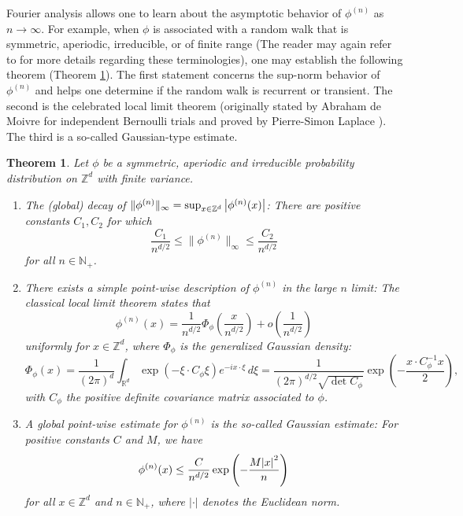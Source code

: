 \documentclass[11pt, letter]{book}
\newtheorem{theorem}{Theorem}[section]
\renewcommand\det{\operatorname{det}}
\newcommand{\lp}{\left(}
\newcommand{\rp}{\right)}
\newcommand{\f}[2]{\frac{#1}{#2}}
\begin{document}
\noindent Fourier analysis allows one to learn about the asymptotic behavior of $\phi^{(n)}$ as $n\to\infty$. For example, when $\phi$ is associated with a random walk that is symmetric, aperiodic, irreducible, or of finite range (The reader may again refer to \cite{spitzer_principles_1964} for more details regarding these terminologies), one may establish the following theorem (Theorem \ref{thm:localglobal}). The first statement concerns the sup-norm behavior of $\phi^{(n)}$ and helps one determine if the random walk is recurrent or transient. The second is the celebrated local limit theorem (originally stated by Abraham de Moivre for independent Bernoulli trials and proved by Pierre-Simon Laplace \cite{mcdonald2005local}). The third is a so-called Gaussian-type estimate.


\begin{framed}
\begin{theorem}\label{thm:localglobal}
Let $\phi$ be a symmetric, aperiodic and irreducible probability distribution on $\mathbb{Z}^d$ with finite variance.
\begin{enumerate}
    \item The (global) decay of $\| \phi^{(n)} \|_\infty = \sup_{x\in \mathbb{Z}^d} \abs{\phi^{(n)}(x)}$: There are positive constants $C_1, C_2$ for which \begin{equation*}
        \f{C_1}{n^{d/2}} \leq \| \phi^{(n)} \|_\infty \leq \f{C_2}{n^{d/2}}
    \end{equation*}
    for all $n\in \mathbb{N}_+$.
    
    \item There exists a simple point-wise description of $\phi^{(n)}$ in the large $n$ limit: The classical local limit theorem states that
    \begin{equation*}
        \phi^{(n)}(x) = \f{1}{n^{d/2}} \Phi_\phi \lp \f{x}{n^{d/2}} \rp + o\lp \f{1}{n^{d/2}} \rp
    \end{equation*}
    uniformly for $x\in \mathbb{Z}^d$, where $\Phi_\phi$ is the generalized Gaussian density:
    \begin{equation*}
        \Phi_\phi(x) = \f{1}{(2\pi)^d} \int_{\mathbb{R}^d} \exp\lp -\xi \cdot C_\phi \xi \rp e^{-ix\cdot \xi}\,d\xi = \f{1}{(2\pi)^{d/2} \sqrt{\det C_\phi} }\exp \lp -\f{x\cdot C_\phi^{-1} x }{2} \rp,
    \end{equation*}
    with $C_\phi$ the positive definite covariance matrix associated to $\phi$. 
    
    \item A global point-wise estimate for $\phi^{(n)}$ is the so-called Gaussian estimate: For positive constants $C$ and $M$, we have
    \begin{equation*}
        \phi^{(n)}(x) \leq \f{C}{n^{d/2}} \exp \lp -\f{M\abs{x}^2}{n} \rp
    \end{equation*}
    for all $x\in \mathbb{Z}^d$ and $n\in \mathbb{N}_+$, where $|\cdot|$ denotes the Euclidean norm. 
\end{enumerate}
\end{theorem}
\end{framed}
\end{document}
